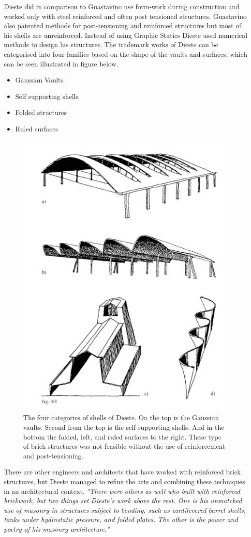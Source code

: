 Dieste did in comparison to Guastavino use form-work during construction and worked only with steel reinforced and often post tensioned structures. Guastavino also patented methods for post-tensioning and reinforced structures but most of his shells are unreinforced. Instead of using Graphic Statics Dieste used numerical methods to design his structures. The trademark works of Dieste can be categorised into four families based on the shape of the vaults and surfaces\cite{ref:Dieste}, which can be seen illustrated in figure below.

\begin{itemize}

\item Gaussian Vaults
\item Self supporting shells
\item Folded structures
\item Ruled surfaces
\end{itemize}

\begin{figure}[H]
\centering
\includegraphics[width=0.6\linewidth ]{figure/Introduction/DiesteFour.JPG}
\caption{The four categories of shells of Dieste. On the top is the Gaussian vaults. Second from the top is the self supporting shells. And in the bottom the folded, left, and ruled surfaces to the right. These type of brick structures was not feasible without the use of reinforcement and post-tensioning.\cite{ref:Dieste}}
\end{figure}
There are other engineers and architects that have worked with reinforced brick structures, but Dieste managed to refine the arts and combining these techniques in an architectural context. 
\textit{"There were others as well who built with reinforced brickwork, but two things set Dieste’s work above the rest. One is his unmatched use of masonry in structures subject to bending, such as cantilevered barrel shells, tanks under hydrostatic pressure, and folded plates. The other is the power and poetry of his masonry architecture."}\cite{ref:Dieste}



